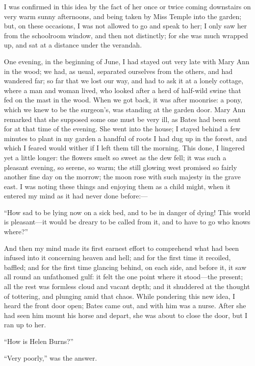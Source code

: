 I was confirmed in this idea by the fact of her once or twice coming
downstairs on very warm sunny afternoons, and being taken by Miss Temple
into the garden; but, on these occasions, I was not allowed to go and
speak to her; I only saw her from the schoolroom window, and then not
distinctly; for she was much wrapped up, and sat at a distance under the
verandah.

One evening, in the beginning of June, I had stayed out very late with
Mary Ann in the wood; we had, as usual, separated ourselves from the
others, and had wandered far; so far that we lost our way, and had to
ask it at a lonely cottage, where a man and woman lived, who looked
after a herd of half-wild swine that fed on the mast in the wood. When
we got back, it was after moonrise: a pony, which we knew to be the
surgeon's, was standing at the garden door. Mary Ann remarked that she
supposed some one must be very ill, as \Mr{} Bates had been sent for at
that time of the evening. She went into the house; I stayed behind a
few minutes to plant in my garden a handful of roots I had dug up in the
forest, and which I feared would wither if I left them till the
morning. This done, I lingered yet a little longer: the flowers smelt
so sweet as the dew fell; it was such a pleasant evening, so serene, so
warm; the still glowing west promised so fairly another fine day on the
morrow; the moon rose with such majesty in the grave east. I was noting
these things and enjoying them as a child might, when it entered my mind
as it had never done before:---

\enquote{How sad to be lying now on a sick bed, and to be in danger of
dying! This world is pleasant---it would be dreary to be called from
it, and to have to go who knows where?}

And then my mind made its first earnest effort to comprehend what had
been infused into it concerning heaven and hell; and for the first time
it recoiled, baffled; and for the first time glancing behind, on each
side, and before it, it saw all round an unfathomed gulf: it felt the
one point where it stood---the present; all the rest was formless cloud
and vacant depth; and it shuddered at the thought of tottering, and
plunging amid that chaos. While pondering this new idea, I heard the
front door open; \Mr{} Bates came out, and with him was a nurse. After
she had seen him mount his horse and depart, she was about to close the
door, but I ran up to her.

\enquote{How is Helen Burns?}

\enquote{Very poorly,} was the answer.

